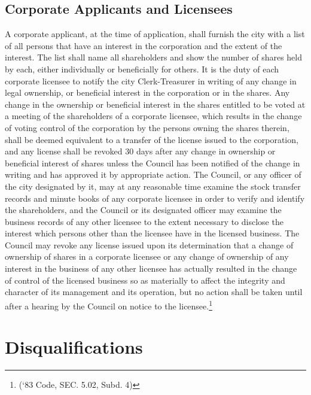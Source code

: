 \subsection{Corporate Applicants and Licensees}
A corporate applicant, at the time of application, shall furnish the city with a list of all persons that have an interest in the corporation and the extent of the interest.  The list shall name all shareholders and show the number of shares held by each, either individually or beneficially for others.  It is the duty of each corporate licensee to notify the city Clerk-Treasurer in writing of any change in legal ownership, or beneficial interest in the corporation or in the shares.  Any change in the ownership or beneficial interest in the shares entitled to be voted at a meeting of the shareholders of a corporate licensee, which results in the change of voting control of the corporation by the persons owning the shares therein, shall be deemed equivalent to a transfer of the license issued to the corporation, and any license shall be revoked 30 days after any change in ownership or beneficial interest of shares unless the Council has been notified of the change in writing and has approved it by appropriate action.  The Council, or any officer of the city designated by it, may at any reasonable time examine the stock transfer records and minute books of any corporate licensee in order to verify and identify the shareholders, and the Council or its designated officer may examine the business records of any other licensee to the extent necessary to disclose the interest which persons other than the licensee have in the licensed business.  The Council may revoke any license issued upon its determination that a change of ownership of shares in a corporate licensee or any change of ownership of any interest in the business of any other licensee has actually resulted in the change of control of the licensed business so as materially to affect the integrity and character of its management and its operation, but no action shall be taken until after a hearing by the Council on notice to the licensee.\footnote{(‘83 Code, SEC. 5.02, Subd. 4)}

\section{Disqualifications}
